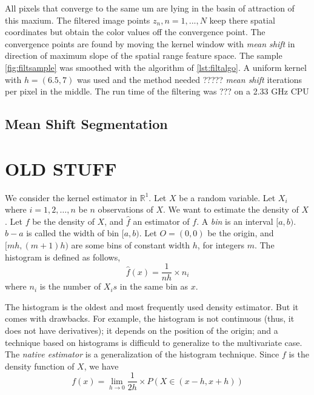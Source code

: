 All pixels that converge to the same um are lying in the basin of attraction
of this maxium. The filtered image points $z_n, n = 1 , ... , N$ keep there
spatial coordinates but obtain the color values off the convergence point. The
convergence points are found by moving the kernel window with \emph{mean shift} 
in direction of maximum slope of the spatial range feature space. The sample
\autoref{fig:filtsample} was smoothed with the algorithm of \autoref{lst:filtalgo}. 
A uniform kernel with $h = (6.5, 7)$ was used and the method needed ?????
\emph{mean shift} iterations per pixel in the middle. The run time of the filtering
was ??? on a 2.33 \gls{GHz} \gls{CPU}


\subsection{Mean Shift Segmentation} %
\label{sub:mean_shift_segmentation}






\section{OLD STUFF} %
\label{sec:old_stuff}

We consider the kernel 
estimator in
$\mathbb{R}^1$. Let $X$ be a random variable. Let $X_i$ where $i=1,2,\ldots,n$ be
$n$ observations of $X$. We want to estimate the density  of $X$. Let $f$ be the
density of $X$, and $\hat{f}$ an estimator of $f$. A \emph{bin} is an interval
$[a,b)$. $b-a$ is called the width of bin $[a,b)$. Let $O=(0,0)$ be the origin, 
and $[mh, (m+1)h)$ are some bins of constant width $h$, for integers $m$. The
histogram is defined as follows,
\begin{equation}\label{eq:histogram}
	\hat{f}(x)=\frac{1}{nh} \times n_i
\end{equation}
where $n_i$ is the number of $X_i s$ in the same bin as $x$.

The histogram is the oldest and most frequently used density estimator. But it 
comes with drawbacks. For example, the histogram is not continuous (thus, it 
does not have derivatives); it depends on the position of the origin; and a 
technique based on histograms is difficuld to generalize to the multivariate 
case. The \emph{native estimator} is a generalization of the histogram 
technique. Since $f$ is the density function of $X$, we have
\begin{equation}\label{eq:naive_estimator}
	f(x) = \lim\limits_{h \rightarrow 0} \frac{1}{2h} \times P(X \in (x-h,x+h))
\end{equation}


